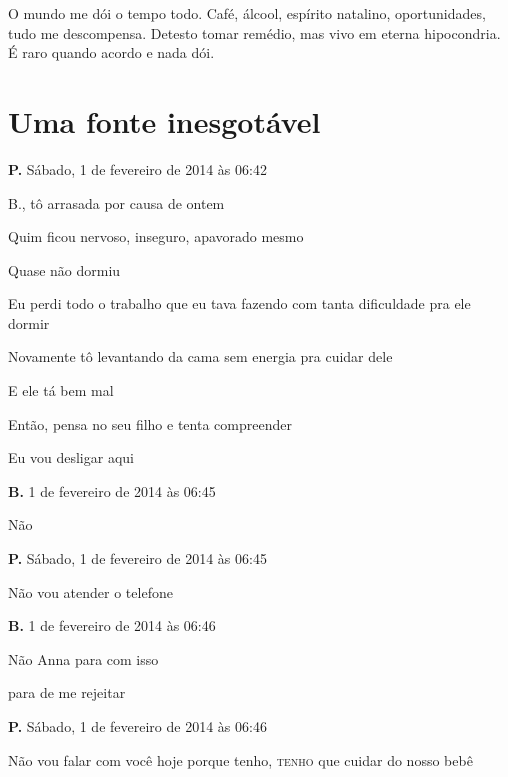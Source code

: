 O mundo me dói o tempo todo. Café, álcool, espírito natalino,
oportunidades, tudo me descompensa. Detesto tomar remédio, mas vivo em
eterna hipocondria. É raro quando acordo e nada dói.

\endgroup

\chapter{Uma fonte inesgotável}\label{uma-fonte-inesgotuxe1vel}

\textbf{P.} Sábado, 1 de fevereiro de 2014 às 06:42

B., tô arrasada por causa de ontem

Quim ficou nervoso, inseguro, apavorado mesmo

Quase não dormiu

Eu perdi todo o trabalho que eu tava fazendo com tanta dificuldade pra
ele dormir

Novamente tô levantando da cama sem energia pra cuidar dele

E ele tá bem mal

Então, pensa no seu filho e tenta compreender

Eu vou desligar aqui

\textbf{B.} 1 de fevereiro de 2014 às 06:45

Não

\textbf{P.} Sábado, 1 de fevereiro de 2014 às 06:45

Não vou atender o telefone

\textbf{B.} 1 de fevereiro de 2014 às 06:46

Não Anna para com isso

para de me rejeitar

\textbf{P.} Sábado, 1 de fevereiro de 2014 às 06:46

Não vou falar com você hoje porque tenho, \textsc{tenho} que cuidar do
nosso bebê

